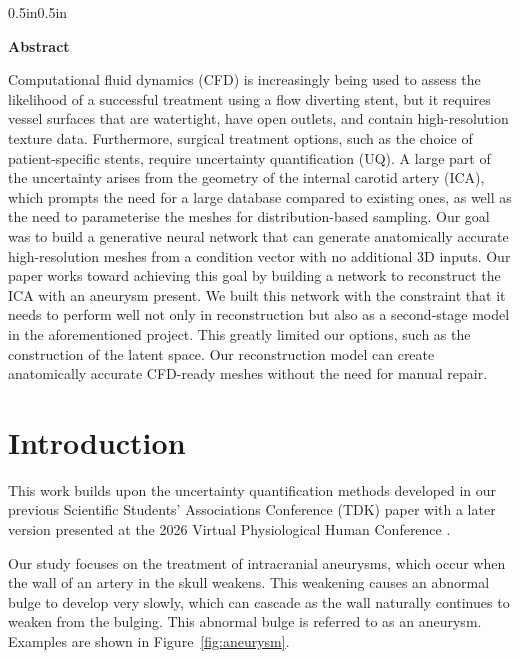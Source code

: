 \documentclass[12pt,a4paper]{article}
\begin{document}
\newpage

\setcounter{page}{1}
\begin{adjustwidth}{0.5in}{0.5in} 
    \begin{center}
        \large\bfseries Abstract
    \end{center}
\noindent Computational fluid dynamics (CFD) is increasingly being used to assess the likelihood of a successful treatment using a flow diverting stent, but it requires vessel surfaces that are watertight, have open outlets, and contain high-resolution texture data. Furthermore, surgical treatment options, such as the choice of patient-specific stents, require uncertainty quantification (UQ). A large part of the uncertainty arises from the geometry of the internal carotid artery (ICA), which prompts the need for a large database compared to existing ones, as well as the need to parameterise the meshes for distribution-based sampling. Our goal was to build a generative neural network that can generate anatomically accurate high-resolution meshes from a condition vector with no additional 3D inputs. Our paper works toward achieving this goal by building a network to reconstruct the ICA with an aneurysm present. We built this network with the constraint that it needs to perform well not only in reconstruction but also as a second-stage model in the aforementioned project. This greatly limited our options, such as the construction of the latent space. Our reconstruction model can create anatomically accurate CFD-ready meshes without the need for manual repair.
\end{adjustwidth}


\tableofcontents

\section{Introduction}

This work builds upon the uncertainty quantification methods developed in our previous Scientific Students' Associations Conference (TDK) paper \citep{miklos2025} with a later version presented at the 2026 Virtual Physiological Human Conference \citep{miklos2026}.

Our study focuses on the treatment of intracranial aneurysms, which occur when the wall of an artery in the skull weakens. This weakening causes an abnormal bulge to develop very slowly, which can cascade as the wall naturally continues to weaken from the bulging. This abnormal bulge is referred to as an aneurysm. Examples are shown in Figure~\ref{fig:aneurysm}.
\end{document}
